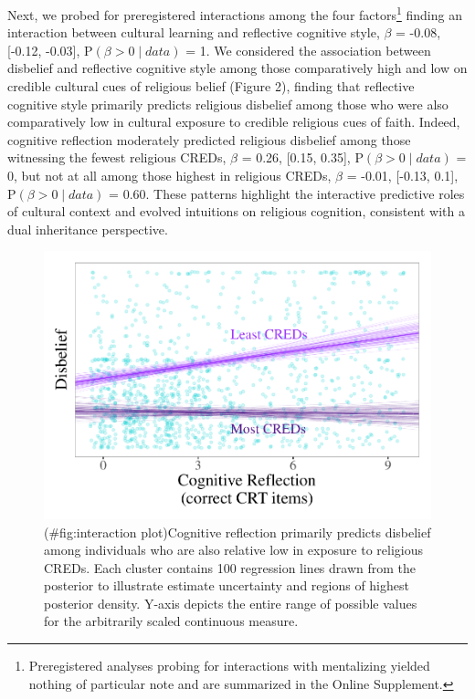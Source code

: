 \documentclass[english,man,mask]{article}
\begin{document}
Next, we probed for preregistered interactions among the four factors\footnote{Preregistered analyses probing for interactions with mentalizing yielded nothing of particular note and are summarized in the Online Supplement.} finding an interaction between cultural learning and reflective cognitive style, \(\beta\) = -0.08, {[}-0.12, -0.03{]}, \(\mathrm{P}(\beta > 0 \mid data)\) = 1. We considered the association between disbelief and reflective cognitive style among those comparatively high and low on credible cultural cues of religious belief (Figure 2), finding that reflective cognitive style primarily predicts religious disbelief among those who were also comparatively low in cultural exposure to credible religious cues of faith. Indeed, cognitive reflection moderately predicted religious disbelief among those witnessing the fewest religious CREDs, \(\beta\) = 0.26, {[}0.15, 0.35{]}, \(\mathrm{P}(\beta > 0 \mid data)\) = 0, but not at all among those highest in religious CREDs, \(\beta\) = -0.01, {[}-0.13, 0.1{]}, \(\mathrm{P}(\beta > 0 \mid data)\) = 0.60. These patterns highlight the interactive predictive roles of cultural context and evolved intuitions on religious cognition, consistent with a dual inheritance perspective.

\begin{figure}
\centering
\includegraphics{papaja-version_files/figure-latex/interaction plot-1.pdf}
\caption{(\#fig:interaction plot)Cognitive reflection primarily predicts disbelief among individuals who are also relative low in exposure to religious CREDs. Each cluster contains 100 regression lines drawn from the posterior to illustrate estimate uncertainty and regions of highest posterior density. Y-axis depicts the entire range of possible values for the arbitrarily scaled continuous measure.}
\end{figure}
\end{document}
